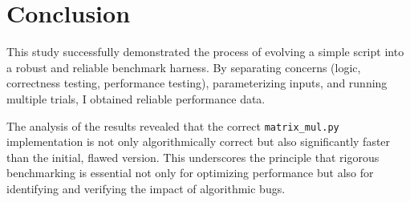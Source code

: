 \documentclass[a4paper]{article}
\begin{document}
\section{Conclusion}
This study successfully demonstrated the process of evolving a simple script into a robust and reliable benchmark harness. By separating concerns (logic, correctness testing, performance testing), parameterizing inputs, and running multiple trials, I obtained reliable performance data.

The analysis of the results revealed that the correct \texttt{matrix\_mul.py} implementation is not only algorithmically correct but also significantly faster than the initial, flawed version. This underscores the principle that rigorous benchmarking is essential not only for optimizing performance but also for identifying and verifying the impact of algorithmic bugs.
\end{document}

